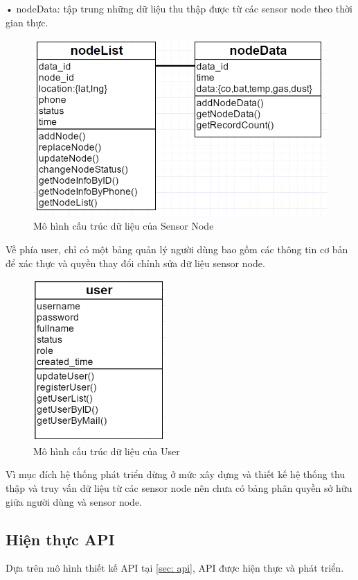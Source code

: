 • nodeData: tập trung những dữ liệu thu thập được từ các sensor node theo thời gian thực. 
\begin{figure}[H]
	\centering    
	\includegraphics[width=1.0\textwidth]{dbnode}
	\caption[Mô hình cấu trúc dữ liệu của Sensor Node]{Mô hình cấu trúc dữ liệu của Sensor Node}
	\label{fig: dbnode}
\end{figure}
Về phía user, chỉ có một bảng quản lý người dùng bao gồm các thông tin cơ bản để xác thực và quyền thay đổi chỉnh sửa dữ liệu sensor node.
\begin{figure}[H]
	\centering    
	\includegraphics[width=0.45\textwidth]{dbuser}
	\caption[Mô hình cấu trúc dữ liệu của User]{Mô hình cấu trúc dữ liệu của User}
	\label{fig: dbuser}
\end{figure}

Vì mục đích hệ thống phát triển dừng ở mức xây dựng và thiết kế hệ thống thu thập và truy vấn dữ liệu từ các sensor node nên chưa có bảng phân quyền sở hữu giữa người dùng và sensor node.
\subsection{Hiện thực API}
Dựa trên mô hình thiết kế API tại \ref{sec: api}, API được hiện thực và phát triển.


